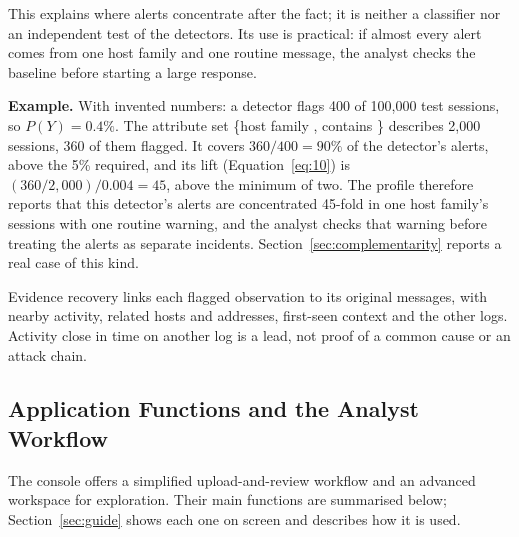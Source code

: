 \documentclass[11pt,a4paper]{article}
\newcommand{\tok}[1]{\texttt{\detokenize{#1}}}
\begin{document}
This explains where alerts concentrate after the fact; it is neither a classifier nor an independent test of the detectors. Its use is practical: if almost every alert comes from one host family and one routine message, the analyst checks the baseline before starting a large response.

\textbf{Example.} With invented numbers: a detector flags 400 of 100,000 test sessions, so \(P(Y)=0.4\%\). The attribute set \{host family \tok{web}, contains \tok{SSH_DEPRECATED_OPTION}\} describes 2,000 sessions, 360 of them flagged. It covers \(360/400=90\%\) of the detector's alerts, above the 5\% required, and its lift (Equation~\ref{eq:10}) is \((360/2{,}000)/0.004=45\), above the minimum of two. The profile therefore reports that this detector's alerts are concentrated 45-fold in one host family's sessions with one routine warning, and the analyst checks that warning before treating the alerts as separate incidents. Section~\ref{sec:complementarity} reports a real case of this kind.

Evidence recovery links each flagged observation to its original messages, with nearby activity, related hosts and addresses, first-seen context and the other logs. Activity close in time on another log is a lead, not proof of a common cause or an attack chain.

\subsection{Application Functions and the Analyst Workflow}

The console offers a simplified upload-and-review workflow and an advanced workspace for exploration. Their main functions are summarised below; Section~\ref{sec:guide} shows each one on screen and describes how it is used.
\end{document}
